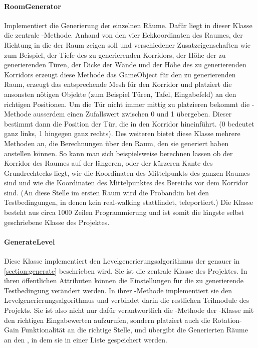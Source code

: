 \begin{multicols*}{2}
    \paragraph{RoomGenerator}
    Implementiert die Generierung der einzelnen Räume. Dafür liegt in dieser Klasse die zentrale -Methode. Anhand von den vier Eckkoordinaten des Raumes, der Richtung in die der Raum zeigen soll und verschiedener Zusatzeigenschaften wie zum Beispiel, der Tiefe des zu generierenden Korridors, der Höhe der zu generierenden Türen, der Dicke der Wände und der Höhe des zu generierenden Korridors erzeugt diese Methode das GameObject für den zu generierenden Raum, erzeugt das entsprechende Mesh für den Korridor und platziert die ansonsten nötigen Objekte (zum Beispiel Türen, Tafel, Eingabefeld) an den richtigen Positionen. Um die Tür nicht immer mittig zu platzieren bekommt die -Methode ausserdem einen Zufallswert zwischen 0 und 1 übergeben. Dieser bestimmt dann die Position der Tür, die in den Korridor hineinführt. (0 bedeutet ganz links, 1 hingegen ganz rechts).
    Des weiteren bietet diese Klasse mehrere Methoden an, die Berechnungen über den Raum, den sie generiert haben anstellen können. So kann man sich beispielsweise berechnen lassen ob der Korridor des Raumes auf der längeren, oder der kürzeren Kante des Grundrechtecks liegt, wie die Koordinaten des Mittelpunkts des ganzen Raumes sind und wie die Koordinaten des Mittelpunktes des Bereichs vor dem Korridor sind. (An diese Stelle im ersten Raum wird die Proband:in bei den Testbedingungen, in denen kein real-walking stattfindet, teleportiert.) Die Klasse besteht aus circa 1000 Zeilen Programmierung und ist somit die längste selbst geschriebene Klasse des Projektes.

    \paragraph{GenerateLevel}
    Diese Klasse implementiert den Levelgenerierungsalgorithmus der genauer in \autoref{section:generate}
    beschrieben wird. Sie ist die zentrale Klasse des Projektes. In ihren öffentlichen Attributen können die Einstellungen für die zu generierende Testbedingung verändert werden. In ihrer -Methode implementiert sie den Levelgenerierungsalgorithmus und verbindet darin die restlichen Teilmodule des Projekts. Sie ist also nicht nur dafür verantwortlich die -Methode der -Klasse mit den richtigen Eingabewerten aufzurufen, sondern platziert auch die Rotation-Gain Funktionalität an die richtige Stelle, und übergibt die Generierten Räume an den , in dem sie in einer Liste gespeichert werden.


\end{multicols*}
